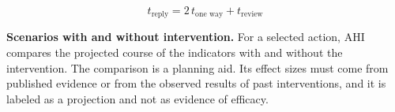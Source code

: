 \begin{equation}
t_{\text{reply}}=2\,t_{\text{one way}}+t_{\text{review}}
\end{equation}

\medskip\noindent\textbf{Scenarios with and without intervention.} For a selected action, AHI compares the projected course of the indicators with and without the intervention. The comparison is a planning aid. Its effect sizes must come from published evidence or from the observed results of past interventions, and it is labeled as a projection and not as evidence of efficacy.
